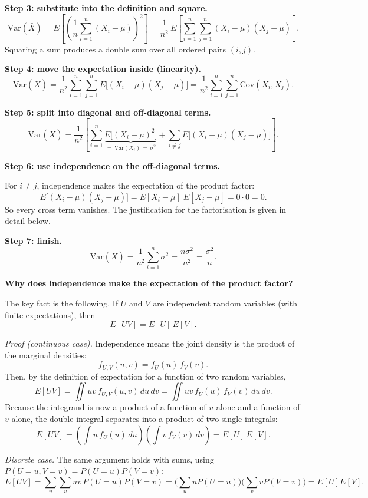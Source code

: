 \documentclass[11pt]{article}
\begin{document}
\textbf{Step 3: substitute into the definition and square.}
\[
\mathrm{Var}(\bar X)
=E\!\left[\left(\frac{1}{n}\sum_{i=1}^{n}(X_i-\mu)\right)^{2}\right]
=\frac{1}{n^{2}}\,E\!\left[\sum_{i=1}^{n}\sum_{j=1}^{n}(X_i-\mu)(X_j-\mu)\right].
\]
Squaring a sum produces a double sum over all ordered pairs \((i,j)\).

\textbf{Step 4: move the expectation inside (linearity).}
\[
\mathrm{Var}(\bar X)
=\frac{1}{n^{2}}\sum_{i=1}^{n}\sum_{j=1}^{n}E\big[(X_i-\mu)(X_j-\mu)\big]
=\frac{1}{n^{2}}\sum_{i=1}^{n}\sum_{j=1}^{n}\mathrm{Cov}(X_i,X_j).
\]

\textbf{Step 5: split into diagonal and off-diagonal terms.}
\[
\mathrm{Var}(\bar X)
=\frac{1}{n^{2}}\left[
\sum_{i=1}^{n}\underbrace{E\big[(X_i-\mu)^2\big]}_{=\,\mathrm{Var}(X_i)\,=\,\sigma^{2}}
+\sum_{i\neq j}E\big[(X_i-\mu)(X_j-\mu)\big]
\right].
\]

\textbf{Step 6: use independence on the off-diagonal terms.}

For \(i\neq j\), independence makes the expectation of the product factor:
\[
E\big[(X_i-\mu)(X_j-\mu)\big]
=E[X_i-\mu]\;E[X_j-\mu]
=0\cdot 0
=0.
\]
So every cross term vanishes. The justification for the factorisation is given in detail below.

\textbf{Step 7: finish.}
\[
\mathrm{Var}(\bar X)
=\frac{1}{n^{2}}\sum_{i=1}^{n}\sigma^{2}
=\frac{n\sigma^{2}}{n^{2}}
=\boxed{\frac{\sigma^{2}}{n}}.
\]

\textbf{Why does independence make the expectation of the product factor?}

The key fact is the following. If \(U\) and \(V\) are independent random variables (with finite expectations), then
\[
E[UV]=E[U]\,E[V].
\]

\emph{Proof (continuous case).} Independence means the joint density is the product of the marginal densities:
\[
f_{U,V}(u,v)=f_U(u)\,f_V(v).
\]
Then, by the definition of expectation for a function of two random variables,
\[
E[UV]
=\iint uv\,f_{U,V}(u,v)\,du\,dv
=\iint uv\,f_U(u)\,f_V(v)\,du\,dv.
\]
Because the integrand is now a product of a function of \(u\) alone and a function of \(v\) alone, the double integral separates into a product of two single integrals:
\[
E[UV]
=\left(\int u\,f_U(u)\,du\right)\left(\int v\,f_V(v)\,dv\right)
=E[U]\,E[V].
\]

\emph{Discrete case.} The same argument holds with sums, using \(P(U=u,V=v)=P(U=u)P(V=v)\):
\[
E[UV]=\sum_{u}\sum_{v}uv\,P(U=u)P(V=v)
=\Big(\sum_u uP(U=u)\Big)\Big(\sum_v vP(V=v)\Big)=E[U]E[V].
\]
\end{document}
